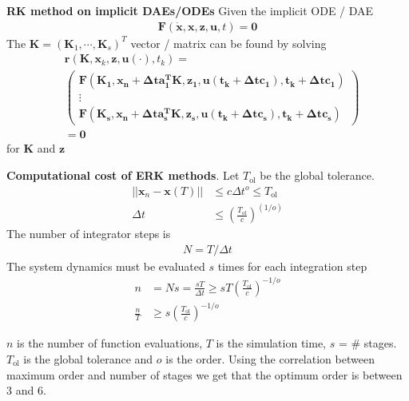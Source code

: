 \textbf{RK method on implicit DAEs/ODEs}
Given the implicit ODE / DAE
\begin{align*}
    \bm{F}(\dot{\bm{x}},\bm{x},\bm{z},\bm{u},t) = \bm{0}
\end{align*}
The \(\bm{K}=(\bm{K}_1,\cdots,\bm{K}_s)^T\) vector / matrix can be found by solving
\begin{align*}
    & \bm{r}(\bm{K},\bm{x}_k,\bm{z},\bm{u}(\cdot),t_k) = \\ 
    & \begin{pmatrix}
        \bm{F(\bm{K}_1,\bm{x}_n+\Delta t\bm{a}_1^T\bm{K},\bm{z}_1,\bm{u}(t_k+\Delta t c_1),t_k+\Delta t c_1)} \\ \vdots \\
        \bm{F(\bm{K}_s,\bm{x}_n+\Delta t\bm{a}_s^T\bm{K},\bm{z}_s,\bm{u}(t_k+\Delta t c_s),t_k+\Delta t c_s)}
    \end{pmatrix} \\ &= \bm{0}
\end{align*}
for \(\bm{K}\) and \(\bm{z}\)
\newline

\textbf{Computational cost of ERK methods}. Let \(T_\textrm{ol}\) be the global tolerance. 
\begin{align*}
    ||\bm{x}_n-\bm{x}(T)|| &\leq c\Delta t^o\leq T_\textrm{ol} \\
    \Delta t &\leq \left(\frac{T_\textrm{ol}}{c}\right)^{(1/o)}
\end{align*}
The number of integrator steps is
\begin{align*}
    N = T/{\Delta t}
\end{align*}
The system dynamics must be evaluated \(s\) times for each integration step
\begin{align*}
    n &= Ns = \frac{sT}{\Delta t} \geq sT\left(\frac{T_\textrm{ol}}{c}\right)^{-1/o} \\
    \frac{n}{T} &\geq s\left(\frac{T_{\textrm{ol}}}{c}\right)^{-1/o}
\end{align*}

\(n\) is the number of function evaluations, \(T\) is the simulation time, \(s\) = \(\#\) stages. \(T_\textrm{ol}\) is the global tolerance and \(o\) is the order. Using the correlation between maximum order and number of stages we get that the optimum order is between 3 and 6.
